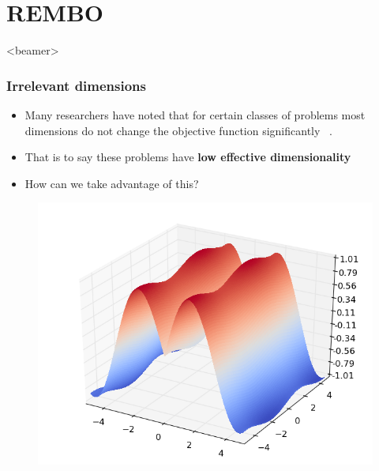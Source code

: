 \documentclass[grey]{beamer}
\begin{document}
 

\section{REMBO}
 \begin{frame}<beamer>
  \tableofcontents[currentsection]
 \end{frame}
   
 \begin{frame}
   \frametitle{Irrelevant dimensions}
    \begin{minipage}[l]{0.6\columnwidth}
     \begin{itemize}
      \item Many researchers have noted that for certain classes of problems 
       most dimensions do not change the objective function significantly
       ~\cite{Bergstra:2012,Hutter:2013_KeyParameters}.
      \item That is to say these problems have 
       {\bf \textcolor{myColor}{low effective dimensionality}}
       \item How can we take advantage of this?
     \end{itemize}

    \end{minipage}
    \begin{minipage}[r]{0.385\columnwidth}
     \begin{figure}[t]
      \includegraphics[width = 1.2\columnwidth]
      {./figs/irrelevant}
      \label{fig:ESSL_BLR}
     \end{figure}
    \end{minipage}
  \end{frame}
\end{document}

